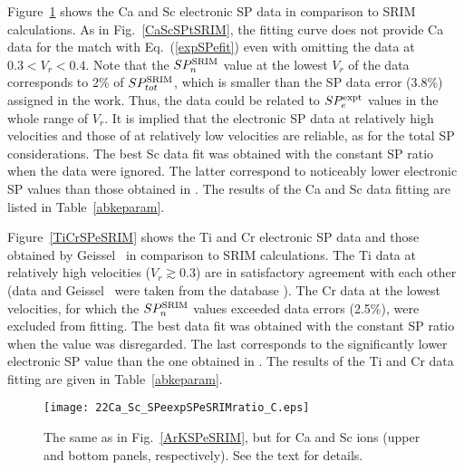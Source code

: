 \documentclass[aps,pra,twocolumn,amsmath,amssymb,floatfix]{revtex4-2}
\begin{document}
Figure~\ref{CaScSPeSRIM} shows the Ca and Sc electronic SP data \cite{Fastrup66,Trzaska18,Sharma99,Perkowski06,ShyKum96} in comparison to SRIM calculations. As in Fig.~\ref{CaScSPtSRIM}, the fitting curve does not provide Ca data for the match with Eq.~(\ref{expSPefit}) even with omitting the data \cite{Sharma99} at $0.3 < V_{r} < 0.4$. Note that the $SP_{n}^{\rm SRIM}$ value at the lowest $V_{r}$ of the data \cite{Perkowski06} corresponds to 2\% of $SP_{tot}^{\rm SRIM}$, which is smaller than the SP data error (3.8\%) assigned in the work.  Thus, the data \cite{Perkowski06} could be related to $SP_{e}^{\rm expt}$ values in the whole range of $V_{r}$. It is implied that the electronic SP data \cite{Perkowski06} at relatively high velocities and those of \cite{Fastrup66} at relatively low velocities are reliable, as for the total SP considerations. The best Sc data fit was obtained with the constant SP ratio when the data \cite{Lennard86} were ignored. The latter correspond to noticeably lower electronic SP values than those obtained in \cite{Fastrup66}. The results of the Ca and Sc data fitting are listed in Table~\ref{abkeparam}.

Figure~\ref{TiCrSPeSRIM} shows the Ti and Cr electronic SP data \cite{Zhang2002,Hvelp68,Lennard86,Pape78,AnthLanf82,Abdess92,Sharma99,ShyKum96,Harikumar96} and those obtained by Geissel \ea\ in comparison to SRIM calculations. The Ti data at relatively high velocities ($V_{r} \gtrsim 0.3$) are in satisfactory agreement with each other (data \cite{AnthLanf82} and Geissel \ea\ were taken from the database \cite{IAEASP}). The Cr data \cite{Zhang2002} at the lowest velocities, for which the $SP_{n}^{\rm SRIM}$ values exceeded data errors (2.5\%), were excluded from fitting. The best data fit was obtained with the constant SP ratio when the value \cite{Lennard86} was disregarded. The last corresponds to the significantly lower electronic SP value than the one obtained in \cite{Fastrup66}. The results of the Ti and Cr data fitting are given in Table~\ref{abkeparam}.

\begin{figure}[!h]   %
\begin{center}
\texttt{[image: 22Ca\_Sc\_SPeexpSPeSRIMratio\_C.eps]}
\caption{\label{CaScSPeSRIM} The same as in Fig.~\ref{ArKSPeSRIM}, but for Ca and Sc ions (upper and bottom panels, respectively). See the text for details.}
\end{center}
\end{figure}
\end{document}
